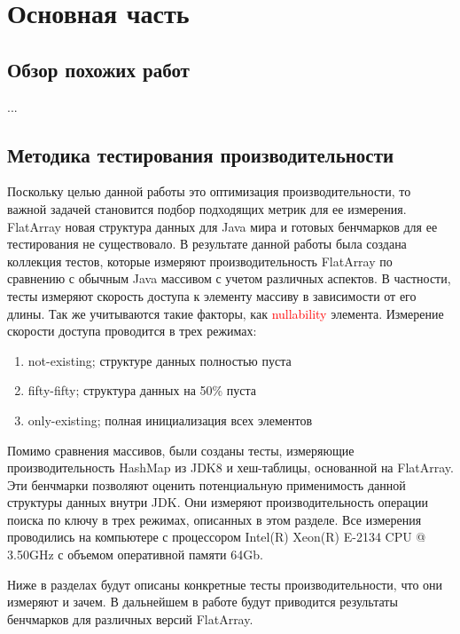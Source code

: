 \section{Основная часть}
\subsection{Обзор похожих работ}
...

\subsection{Методика тестирования производительности}
Поскольку целью данной работы это оптимизация производительности, то важной задачей становится подбор подходящих метрик для ее измерения. FlatArray новая структура данных для Java мира и готовых бенчмарков для ее тестирования не существовало. 
В результате данной работы была создана коллекция тестов, которые измеряют производительность FlatArray по сравнению с обычным Java массивом с учетом различных аспектов.
В частности, тесты измеряют скорость доступа к элементу массиву в зависимости от его длины. Так же учитываются такие факторы, как \textcolor{red}{nullability} элемента. Измерение скорости доступа проводится в трех режимах:
\begin{enumerate}
	\item not-existing; структуре данных полностью пуста
	\item fifty-fifty; структура данных на 50\% пуста
	\item only-existing; полная инициализация всех элементов
\end{enumerate}
Помимо сравнения массивов, были созданы тесты, измеряющие производительность HashMap из JDK8 и хеш-таблицы, основанной на FlatArray. Эти бенчмарки позволяют оценить потенциальную применимость данной структуры данных внутри JDK. Они измеряют производительность операции поиска по ключу в трех режимах, описанных в этом разделе.
Все измерения проводились на компьютере с процессором Intel(R) Xeon(R) E-2134 CPU @ 3.50GHz
с объемом оперативной памяти 64Gb.
\par
Ниже в разделах будут описаны конкретные тесты производительности, что они измеряют и зачем. В дальнейшем в работе будут приводится результаты бенчмарков для различных версий FlatArray.

